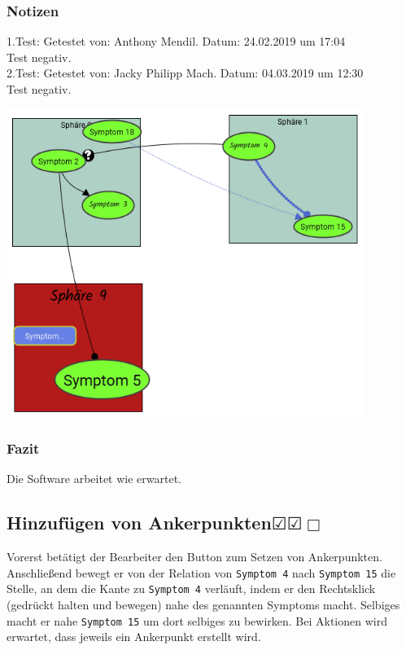 \documentclass[enabledeprecatedfontcommands]{scrartcl}
\newcommand{\subsectiont}[2]{\subsection[#1]{#1{\normalsize\normalfont #2}}}
\newcommand{\leer}{$\Box$}
\newcommand{\ok}{$\CheckedBox$}
\begin{document}
\subsubsection{Notizen}
1.Test: Getestet von: Anthony Mendil. Datum: 24.02.2019 um 17:04 \\
Test negativ. \\
2.Test: Getestet von: Jacky Philipp Mach. Datum: 04.03.2019 um 12:30 \\
Test negativ.
\begin{center}
\includegraphics[height=10cm]{3_36.PNG}
\end{center}
\subsubsection{Fazit}
Die Software arbeitet wie erwartet.

\subsectiont{Hinzufügen von Ankerpunkten}{\dotfill\ok\ok\leer}
Vorerst betätigt der Bearbeiter den Button zum Setzen von Ankerpunkten. Anschließend bewegt er von der Relation von \texttt{Symptom 4} nach \texttt{Symptom 15} die Stelle, an dem die Kante zu \texttt{Symptom 4} verläuft, indem er den Rechtsklick (gedrückt halten und bewegen) nahe des genannten Symptoms macht. Selbiges macht er nahe \texttt{Symptom 15} um dort selbiges zu bewirken. Bei Aktionen wird erwartet, dass jeweils ein Ankerpunkt erstellt wird.
\end{document}
